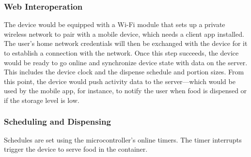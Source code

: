 \documentclass{article}
\begin{document}
\subsubsection{Web Interoperation}
The device would be equipped with a Wi-Fi module that sets up a private wireless network to pair with a mobile device, which needs a client app installed. The user's home network credentials will then be exchanged with the device for it to establish a connection with the network. Once this step succeeds, the device would be ready to go online and synchronize device state with data on the server. This includes the device clock and the dispense schedule and portion sizes. From this point, the device would push activity data to the server---which would be used by the mobile app, for instance, to notify the user when food is dispensed or if the storage level is low.
\subsubsection{Scheduling and Dispensing}
Schedules are set using the microcontroller's online timers. The timer interrupts trigger the device to serve food in the container.
\end{document}

